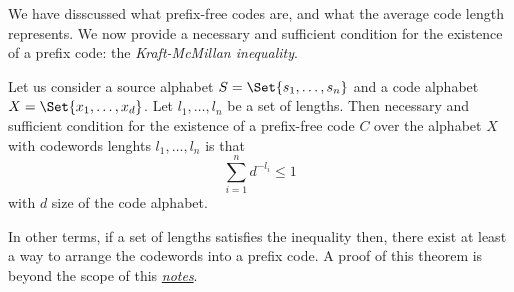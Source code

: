 \documentclass{subfiles}
\begin{document}
    We have disscussed what prefix-free codes are, 
        and what the average code length represents.
    We now provide a necessary and sufficient condition for the existence of 
    a prefix code: the \emph{Kraft-McMillan inequality}.
    \begin{theorem}\label{Thm:2}
        Let us consider a source alphabet \(S = \Set{s_{1}, \ldots, s_{n}}\)
        and a code alphabet \(X =\Set{x_{1}, \ldots, x_{d}}\).
        Let \(l_{1}, \ldots, l_{n}\) be a set of lengths.
        Then necessary and sufficient condition for the existence of a 
        prefix-free code \(C\) over the alphabet \(X\) with codewords lenghts 
        \(l_{1}, \ldots, l_{n}\) is that 
        \[
            \sum_{i = 1}^{n}{d^{-l_{i}}} \le 1
        \]
        with \(d\) size of the code alphabet.
    \end{theorem}
    In other terms, if a set of lengths satisfies the inequality then,
        there exist at least a way to arrange the codewords into a prefix code.
    A proof of this theorem is beyond the scope of this \underline{\em notes}.
\end{document}
